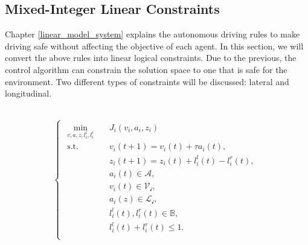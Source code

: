 
\subsection{Mixed-Integer Linear Constraints}

Chapter \ref{linear_model_system} explains the autonomous driving rules to make driving safe without affecting the objective of each agent. In this section, we will convert the above rules into linear logical constraints. Due to the previous, the control algorithm can constrain the solution space to one that is safe for the environment. Two different types of constraints will be discussed: lateral and longitudinal.



\\

\begin{equation}
\left\{ \begin{matrix}
\begin{aligned}
\min_{v,a,z, l_i^l,l_i^r} \quad & J_i\left ( v_i, a_i, z_i \right )\\
\textrm{s.t.} \quad & v_i(t+1) = v_i(t)+\tau a_i(t),\\
  &   z_i(t+1) = z_i(t) + l_i^l(t) - l_i^r(t),   \\
& a_i(t) \in \mathcal{A} ,  \\
& v_i(t) \in \mathcal{V_i} ,  \\
& a_i(z) \in \mathcal{L_i} ,  \\
&  l_i^l(t),l_i^r(t)\in \mathbb{B},   \\
& l_i^l(t) + l_i^r(t)  \leq 1.\\
\end{aligned}
\end{matrix}\right.

\end{equation}

\\


   





